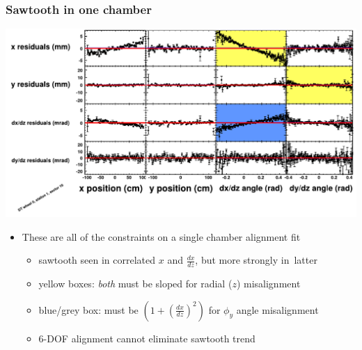 \documentclass[compress]{beamer}
\begin{document}
\begin{frame}
\frametitle{Sawtooth in one chamber}

\vspace{0.35 cm}
\includegraphics[width=\linewidth]{datafit_wh0st1sec10_highp.pdf}

\vspace{-0.35 cm}
\begin{itemize}
\item These are all of the constraints on a single chamber alignment fit
\begin{itemize}\setlength{\itemsep}{0.1 cm}
\item sawtooth seen in correlated $x$ and $\frac{dx}{dz}$, but more strongly \mbox{in latter\hspace{-1 cm}}
\item yellow boxes: {\it both} must be sloped for radial ($z$) misalignment
\item blue/grey box: must be $(1 + (\frac{dx}{dz})^2)$ for $\phi_y$ angle misalignment
\item 6-DOF alignment cannot eliminate sawtooth trend
\end{itemize}
\end{itemize}
\end{frame}
\end{document}
